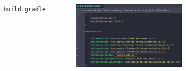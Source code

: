 \documentclass{beamer}
\begin{document}
\begin{frame}
\begin{columns}
\begin{figure}
        \end{figure}
        \indent \texttt{build.gradle}
        \begin{figure}
            \centering
            \includegraphics[width=\textwidth]{images/27.png}
        \end{figure}
    \end{columns}
\end{frame}
\end{document}
